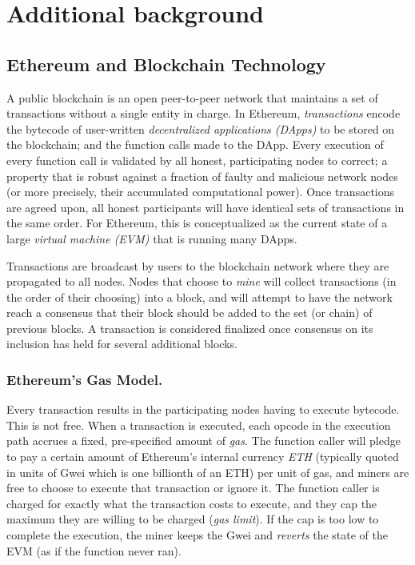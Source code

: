 
\section{Additional background}
\label{app:back}

\subsection{Ethereum and Blockchain Technology}
\label{app:ethback}

A public blockchain is an open peer-to-peer network that maintains a set of transactions without a single entity in charge. In Ethereum, \emph{transactions} encode the bytecode of user-written \emph{decentralized applications (DApps)} to be stored on the blockchain; and the function calls made to the DApp. Every execution of every function call is validated by all honest, participating nodes to correct; a property that is robust against a fraction of faulty and malicious network nodes (or more precisely, their accumulated computational power). Once transactions are agreed upon, all honest participants will have identical sets of transactions in the same order. For Ethereum, this is conceptualized as the current state of a large \emph{virtual machine (EVM)} that is running many DApps.

Transactions are broadcast by users to the blockchain network where they are propagated to all nodes. Nodes that choose to \emph{mine} will collect transactions (in the order of their choosing) into a block, and will attempt to have the network reach a consensus that their block should be added to the set (or chain) of previous blocks. A transaction is considered finalized once consensus on its inclusion has held for several additional blocks.


\subsubsection{Ethereum's Gas Model.} 

Every transaction results in the participating nodes having to execute bytecode. This is not free. When a transaction is executed, each opcode in the execution path accrues a fixed, pre-specified amount of \emph{gas}. The function caller will pledge to pay a certain amount of Ethereum's internal currency \emph{ETH} (typically quoted in units of Gwei which is one billionth of an ETH) per unit of gas, and miners are free to choose to execute that transaction or ignore it. The function caller is charged for exactly what the transaction costs to execute, and they cap the maximum they are willing to be charged (\textit{gas limit}). If the cap is too low to complete the execution, the miner keeps the Gwei and \emph{reverts} the state of the EVM (as if the function never ran).

